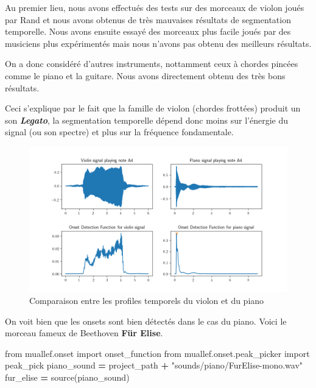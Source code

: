 \documentclass[]{article}
\newenvironment{Shaded}{\begin{snugshade}}{\end{snugshade}}
\newcommand{\ImportTok}[1]{#1}
\newcommand{\NormalTok}[1]{#1}
\newcommand{\OperatorTok}[1]{\textcolor[rgb]{0.81,0.36,0.00}{\textbf{#1}}}
\newcommand{\StringTok}[1]{\textcolor[rgb]{0.31,0.60,0.02}{#1}}
\begin{document}
Au premier lieu, nous avons effectués des tests sur des morceaux de
violon joués par Rand et nous avons obtenus de très mauvaises résultats
de segmentation temporelle. Nous avons ensuite essayé des morceaux plus
facile joués par des musiciens plus expérimentés mais nous n'avons pas
obtenu des meilleurs résultats.

On a donc considéré d'autres instruments, nottamment ceux à chordes
pincées comme le piano et la guitare. Nous avons directement obtenu des
très bons résultats.

Ceci s'explique par le fait que la famille de violon (chordes frottées)
produit un son \textbf{\emph{Legato}}, la segmentation temporelle dépend
donc moins sur l'énergie du signal (ou son spectre) et plus sur la
fréquence fondamentale.

\begin{figure}
\centering
\includegraphics{../../figures/out/onset.png}
\caption{Comparaison entre les profiles temporels du violon et du piano}
\end{figure}

On voit bien que les onsets sont bien détectés dans le cas du piano.
Voici le morceau fameux de Beethoven \textbf{Für Elise}.

\begin{Shaded}
\begin{Highlighting}[]
\ImportTok{from}\NormalTok{ muallef.onset }\ImportTok{import}\NormalTok{ onset_function}
\ImportTok{from}\NormalTok{ muallef.onset.peak_picker }\ImportTok{import}\NormalTok{ peak_pick}
\NormalTok{piano_sound }\OperatorTok{=}\NormalTok{ project_path }\OperatorTok{+} \StringTok{"sounds/piano/FurElise-mono.wav"}
\NormalTok{fur_elise }\OperatorTok{=}\NormalTok{ source(piano_sound)}
\end{Highlighting}
\end{Shaded}
\end{document}

